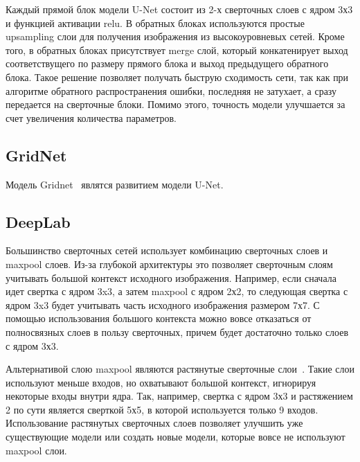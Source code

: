 Каждый прямой блок модели U-Net состоит из 2-х сверточных слоев с ядром 3х3 и функцией активации relu. В обратных блоках используются простые upsampling слои для получения изображения из высокоуровневых сетей. Кроме того, в обратных блоках присутствует merge слой, который конкатенирует выход соответствущего по размеру прямого блока и выход предыдущего обратного блока. Такое решение позволяет получать быструю сходимость сети, так как при алгоритме обратного распространения ошибки, последняя не затухает, а сразу передается на сверточные блоки. Помимо этого, точность модели улучшается за счет увеличения количества параметров.   

\subsection{GridNet}

Модель Gridnet~\cite{gridnet} являтся развитием модели U-Net.

\subsection{DeepLab}

Большинство сверточных сетей использует комбинацию сверточных слоев и maxpool слоев. Из-за глубокой архитектуры это позволяет сверточным слоям учитывать большой контекст исходного изображения. Например, если сначала идет свертка с ядром 3x3, а затем maxpool с ядром 2х2, то следующая свертка с ядром 3x3 будет учитывать часть исходного изображения размером 7х7. С помощью использования большого контекста можно вовсе отказаться от полносвязных слоев в пользу сверточных, причем будет достаточно только слоев с ядром 3х3.

Альтернативой слою maxpool являются растянутые сверточные слои~\cite{dilated_conv}. Такие слои используют меньше входов, но охватывают большой контекст, игнорируя некоторые входы внутри ядра. Так, например, свертка с ядром 3х3 и растяжением 2 по сути является сверткой 5х5, в которой используется только 9 входов. Использование растянутых сверточных слоев позволяет улучшить уже существующие модели или создать новые модели, которые вовсе не используют maxpool слои.
